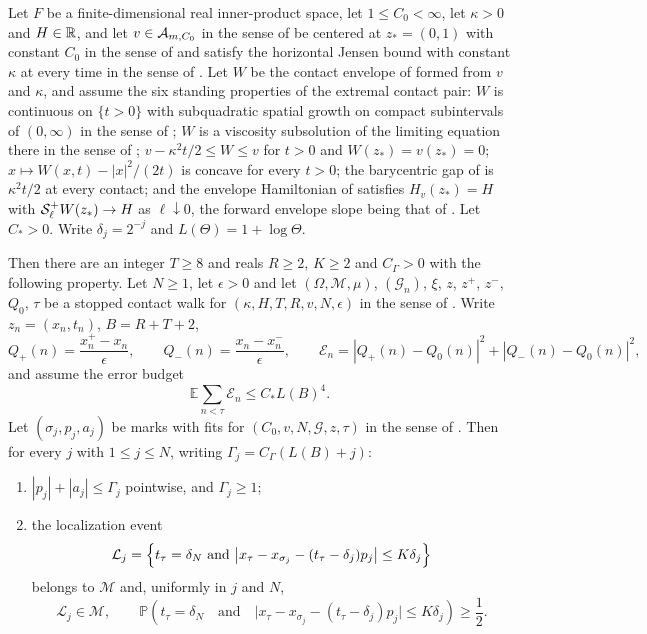 \begin{lemma}
Let $F$ be a finite-dimensional real inner-product space, let
$1\le C_0<\infty$, let $\kappa>0$ and $H\in\mathbb{R}$, and let $v\in\mathcal{A}_{m,C_0}$
in the sense of  be centered at $z_*=(0,1)$ with constant
$C_0$ in the sense of  and satisfy the horizontal Jensen
bound with constant $\kappa$ at every time in the sense of
. Let $W$ be the contact envelope of
 formed from $v$ and $\kappa$, and assume the six standing
properties of the extremal contact pair: $W$ is continuous on $\{t>0\}$ with
subquadratic spatial growth on compact subintervals of $(0,\infty)$ in the
sense of ; $W$ is a viscosity subsolution of the
limiting equation there in the sense of ;
$v-\kappa^2t/2\le W\le v$ for $t>0$ and $W(z_*)=v(z_*)=0$;
$x\mapsto W(x,t)-|x|^2/(2t)$ is concave for every $t>0$; the barycentric gap of
 is $\kappa^2t/2$ at every contact; and the envelope
Hamiltonian of  satisfies $H_v(z_*)=H$ with
$\mathcal{S}_\ell^+W(z_*)\to H$ as $\ell\downarrow0$, the forward envelope slope being
that of . Let $C_*>0$. Write $\delta_j=2^{-j}$ and
$L(\Theta)=1+\log\Theta$.

Then there are an integer $T\ge8$ and reals $R\ge2$, $K\ge2$ and
$C_\Gamma>0$ with the following property. Let $N\ge1$, let
$\epsilon>0$ and let $(\Omega,\mathcal M,\mu)$, $(\mathcal G_n)$, $\xi$, $z$,
$z^+$, $z^-$, $Q_0$, $\tau$ be a stopped contact walk for
$(\kappa,H,T,R,v,N,\epsilon)$ in the sense of . Write
$z_n=(x_n,t_n)$, $B=R+T+2$,
\[
  Q_+(n)=\frac{x^+_n-x_n}{\epsilon},\qquad
  Q_-(n)=\frac{x_n-x^-_n}{\epsilon},\qquad
  \mathcal E_n=|Q_+(n)-Q_0(n)|^2+|Q_-(n)-Q_0(n)|^2,
\]
and assume the error budget
\begin{equation}\label{eq:ml-contact-error-budget-hyp}
  \mathbb E\sum_{n<\tau}\mathcal E_n\le C_*L(B)^4 .
\end{equation}
Let $(\sigma_j,p_j,a_j)$ be marks with fits for
$(C_0,v,N,\mathcal G,z,\tau)$ in the sense of . Then for
every $j$ with $1\le j\le N$, writing $\Gamma_j=C_\Gamma(L(B)+j)$:
\begin{enumerate}
\item[(i)] $|p_j|+|a_j|\le\Gamma_j$ pointwise, and $\Gamma_j\ge1$;
\item[(ii)] the localization event
\[
  \mathcal L_j=\Bigl\{t_\tau=\delta_N\ \text{and}\
     \bigl|x_\tau-x_{\sigma_j}-(t_\tau-\delta_j)p_j\bigr|\le K\delta_j\Bigr\}
\]
belongs to $\mathcal M$ and, uniformly in $j$ and $N$,
\begin{equation}\label{eq:contact-finite-localization}
  \mathcal L_j\in\mathcal M,\qquad
  \mathbb P\left(t_\tau=\delta_N\quad\text{and}\quad
     \bigl|x_\tau-x_{\sigma_j}-(t_\tau-\delta_j)p_j\bigr|\le K\delta_j\right)
   \ge\frac12 .
\end{equation}
\end{enumerate}
\end{lemma}
